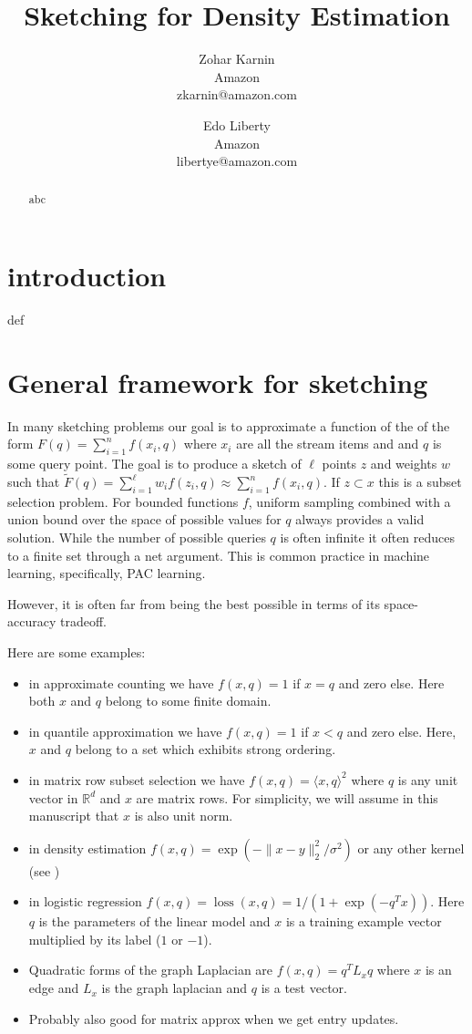 \documentclass{article} %
\title{Sketching for Density Estimation}
\date{\nonumber}
\author{
Zohar Karnin\\Amazon\\zkarnin@amazon.com
\and
Edo Liberty\\Amazon\\libertye@amazon.com
}
\newcommand{\R}{\mathbb{R}}
\begin{document}
\maketitle

\begin{abstract}
abc
\end{abstract}

\section{introduction}
def

\section{General framework for sketching}
In many sketching problems our goal is to approximate a function of the of the form $F(q) = \sum_{i=1}^{n} f(x_i, q)$ where $x_i$ are all the stream items and and $q$ is some query point. 
The goal is to produce a sketch of $\ell$ points $z$ and weights $w$ such that $\tilde F(q) = \sum_{i=1}^{\ell}w_i f(z_i,q) \approx \sum_{i=1}^{n} f(x_i, q)$. 
If $z \subset x$ this is a subset selection problem. 
For bounded functions $f$, uniform sampling combined with a union bound over the space of possible values for $q$ always provides a valid solution. 
While the number of possible queries $q$ is often infinite it often reduces to a finite set through a net argument. 
This is common practice in machine learning, specifically, PAC learning. 

However, it is often far from being the best possible in terms of its space-accuracy tradeoff. 

Here are some examples:
\begin{itemize}
\item in approximate counting we have $f(x, q) = 1$ if $x=q$ and zero else. Here both $x$ and $q$ belong to some finite domain.
\item in quantile approximation we have $f(x, q) = 1$ if $x<q$ and zero else. Here, $x$ and $q$ belong to a set which exhibits strong ordering.
\item in matrix row subset selection we have $f(x, q) = \langle x,q \rangle ^2$ where $q$ is any unit vector in $\R^d$ and $x$ are matrix rows. For simplicity, we will assume in this manuscript that $x$ is also unit norm.
\item in density estimation $f(x, q) = \exp(- \|x-y\|_2^2/\sigma^2)$ or any other kernel (see \cite{})
\item in logistic regression $f(x, q) = \operatorname{loss}(x,q) = 1/(1 + \exp(-q^T x))$. 
Here $q$ is the parameters of the linear model and $x$ is a training example vector multiplied by its label ($1$ or $-1$).
\item Quadratic forms of the graph Laplacian are $f(x, q) = q^T L_x q$ where $x$ is an edge and $L_x$ is the graph laplacian and $q$ is a test vector.
\item Probably also good for matrix approx when we get entry updates. 
\end{itemize}
\end{document}
